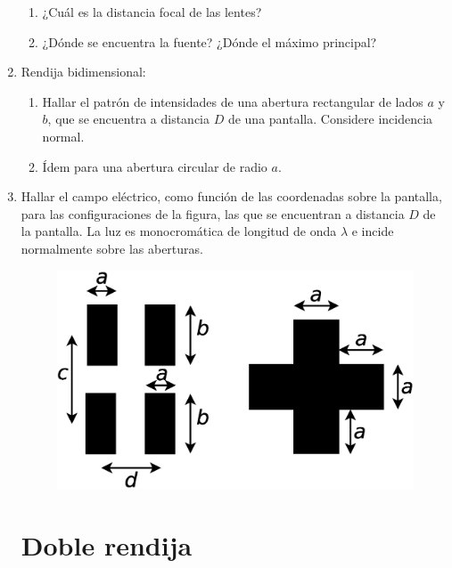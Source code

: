 \documentclass[11pt,spanish]{article}
\begin{document}
\begin{enumerate}
    \begin{enumerate}
        \item ¿Cuál es la distancia focal de las lentes? 
        \item ¿Dónde se encuentra la fuente? ¿Dónde el máximo principal? 
    \end{enumerate}


    \item Rendija bidimensional:
    
    \begin{enumerate}
        \item Hallar el patrón de intensidades de una abertura rectangular de lados
        $a$ y $b$, que se encuentra a distancia $D$ de una pantalla. Considere
        incidencia normal. 
        
        \item Ídem para una abertura circular de radio $a$.
    \end{enumerate}


    \item Hallar el campo eléctrico, como función de las coordenadas sobre la
    pantalla, para las configuraciones de la figura, las que se encuentran
    a distancia $D$ de la pantalla. La luz es monocromática de longitud
    de onda $\lambda$ e incide normalmente sobre las aberturas.

    \begin{figure}[H]
        \centering{}
        \includegraphics[clip,scale=0.25]{figs/ej5-35}
    \end{figure}


\section*{Doble rendija}


\end{enumerate}
\end{document}
